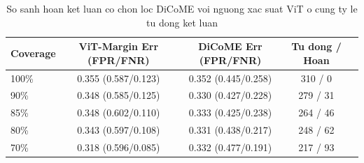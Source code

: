 \begin{table}[t]
\centering
\caption{So sanh hoan ket luan co chon loc DiCoME voi nguong xac suat ViT o cung ty le tu dong ket luan}
\begin{tabular}{lcccc}
\toprule
Coverage & ViT-Margin Err (FPR/FNR) & DiCoME Err (FPR/FNR) & Tu dong / Hoan \\
\midrule
100\% & 0.355 (0.587/0.123) & 0.352 (0.445/0.258) & 310 / 0 \\
90\% & 0.348 (0.585/0.125) & 0.330 (0.427/0.228) & 279 / 31 \\
85\% & 0.348 (0.602/0.110) & 0.333 (0.425/0.238) & 264 / 46 \\
80\% & 0.343 (0.597/0.108) & 0.331 (0.438/0.217) & 248 / 62 \\
70\% & 0.318 (0.596/0.085) & 0.332 (0.477/0.191) & 217 / 93 \\
\bottomrule
\end{tabular}
\end{table}